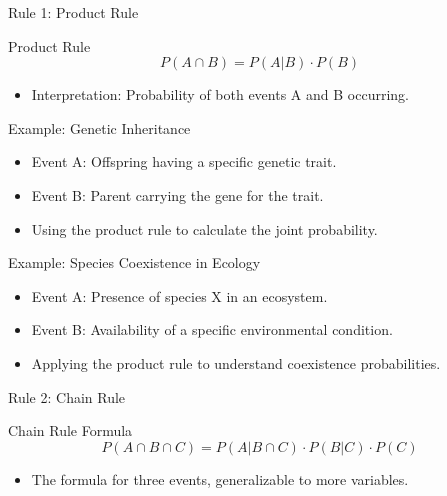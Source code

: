 \documentclass{beamer}
\begin{document}
\begin{frame}{Rule 1: Product Rule}
  \begin{block}{Product Rule}
    \[
      P(A \cap B) = P(A|B) \cdot P(B)
    \]
    \begin{itemize}
      \item Interpretation: Probability of both events A and B occurring.
    \end{itemize}
  \end{block}
\end{frame}

\begin{frame}{Example: Genetic Inheritance}
  \begin{itemize}
    \item Event A: Offspring having a specific genetic trait.
    \item Event B: Parent carrying the gene for the trait.
    \item Using the product rule to calculate the joint probability.
  \end{itemize}
\end{frame}

\begin{frame}{Example: Species Coexistence in Ecology}
  \begin{itemize}
    \item Event A: Presence of species X in an ecosystem.
    \item Event B: Availability of a specific environmental condition.
    \item Applying the product rule to understand coexistence probabilities.
  \end{itemize}
\end{frame}



\begin{frame}{Rule 2: Chain Rule}
  \begin{block}{Chain Rule Formula}
    \[
      P(A \cap B \cap C) = P(A|B \cap C) \cdot P(B|C) \cdot P(C)
    \]
  \end{block}

  \begin{itemize}
    \item The formula for three events, generalizable to more variables.
  \end{itemize}
\end{frame}
\end{document}
